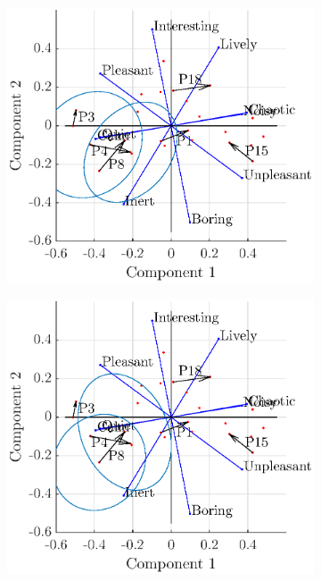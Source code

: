 \documentclass[11pt,a4paper]{article}
\begin{document}
\begin{figure}[h]
    \centering
    \begin{subfigure}[t]{0.45\textwidth}
        \centering
        \includegraphics[width=\textwidth]{figures/pca_p4.eps}
    \end{subfigure}%
    \begin{subfigure}[t]{0.45\textwidth}
        \centering
        \includegraphics[width=\textwidth]{figures/pca_p8.eps}
    \end{subfigure}
\end{figure}
\end{document}
